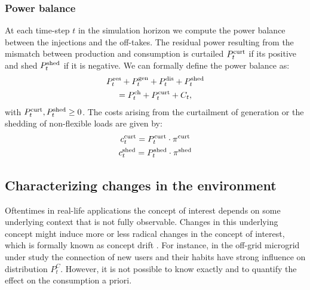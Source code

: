 \documentclass{article}
\begin{document}
\subsubsection{Power balance}
    At each time-step $t$ in the simulation horizon we compute the power balance between the injections and the off-takes. The residual power resulting from the mismatch between production and consumption is curtailed $P^\text{curt}_t$ if its positive and shed $P^\text{shed}_t$ if it is negative. We can formally define the power balance as:
    \begin{gather}
    P^\text{res}_{t} + P^\text{gen}_{t} + P^{\text{dis}}_{t} + P^\text{shed}_{t} \\\notag
    =P^{\text{ch}}_{t} + P^\text{curt}_{t}  + C_{t},\label{eqn: powerbalance}
    \end{gather}
    with $P^\text{curt}_t , P^\text{shed}_t \geq 0$.
    The costs arising from the curtailment of generation or the shedding of non-flexible loads are given by: 
    \begin{gather}
    c^\text{curt}_t = P^\text{curt}_t \cdot \pi^{\text{curt}} \label{eqn: curtcost}\\
    c^\text{shed}_t = P^\text{shed}_t \cdot \pi^{\text{shed}} \label{eqn: shedcost}
    \end{gather}
    

\subsection{Characterizing changes in the environment}
	
	Oftentimes in real-life applications the concept of interest depends on some underlying context that is not fully observable. Changes in this underlying concept might induce more or less radical changes in the concept of interest, which is formally known as concept drift \cite{tsymbal2004problem}. For instance, in the off-grid microgrid under study the connection of new users and their habits have strong influence on distribution $ P^{C}_{t}$. However, it is not possible to know exactly and to quantify the effect on the consumption a priori. 
	
\end{document}
